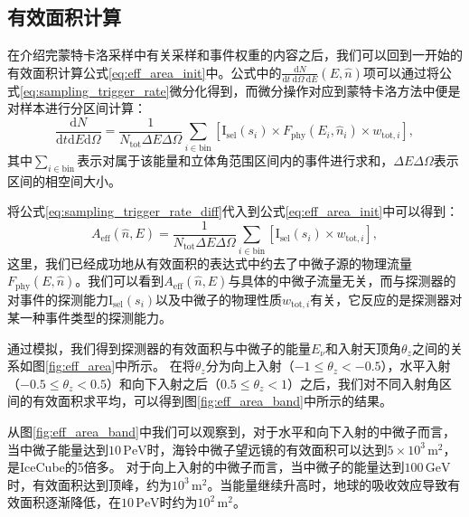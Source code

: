 \subsection{有效面积计算}

在介绍完蒙特卡洛采样中有关采样和事件权重的内容之后，我们可以回到一开始的有效面积计算公式\ref{eq:eff_area_init}中。公式中的$\frac{\mathrm{d}N}{\mathrm{d}t ~\mathrm{d}\Omega ~\mathrm{d}E}(E, \hat{n})$项可以通过将公式\ref{eq:sampling_trigger_rate}微分化得到，而微分操作对应到蒙特卡洛方法中便是对样本进行分区间计算：
\begin{equation}
    \frac{\mathrm{d}N}{\mathrm{d}t \mathrm{d}E \mathrm{d}\Omega} = 
    \frac{1}{N_\mathrm{tot} \Delta E \Delta\Omega} \sum_{i \in \mathrm{bin}} \left[ 
    \mathrm{I}_\mathrm{sel}(s_i) \times 
    F_\mathrm{phy} (E_i, \hat{n}_i) \times
    w_{\mathrm{tot}, i} \right] ,
\label{eq:sampling_trigger_rate_diff}
\end{equation}
其中$\sum_{i \in \mathrm{bin}}$表示对属于该能量和立体角范围区间内的事件进行求和，$\Delta E \Delta\Omega$表示区间的相空间大小。

将公式\ref{eq:sampling_trigger_rate_diff}代入到公式\ref{eq:eff_area_init}中可以得到：
\begin{equation}
    A_\mathrm{eff} (\hat{n}, E) = \frac{1}{N_\mathrm{tot} \Delta E \Delta\Omega} \sum_{i \in \mathrm{bin}} \left[ 
    \mathrm{I}_\mathrm{sel}(s_i) \times 
    w_{\mathrm{tot}, i} \right] ,
    \label{eq:eff_area}
\end{equation}
这里，我们已经成功地从有效面积的表达式中约去了中微子源的物理流量$F_\mathrm{phy} (E, \hat{n})$。我们可以看到$A_\mathrm{eff} (\hat{n}, E)$与具体的中微子流量无关，而与探测器的对事件的探测能力$\mathrm{I}_\mathrm{sel}(s_i)$以及中微子的物理性质$w_{\mathrm{tot}, i}$有关，它反应的是探测器对某一种事件类型的探测能力。

通过模拟，我们得到探测器的有效面积与中微子的能量$E_\nu$和入射天顶角$\theta_z$之间的关系如图\ref{fig:eff_area}中所示。
在将$\theta_z$分为向上入射（$-1 \leq \theta_z < -0.5$），水平入射（$-0.5 \leq \theta_z < 0.5$）和向下入射之后（$0.5 \leq \theta_z < 1$）之后，我们对不同入射角区间的有效面积求平均，可以得到图\ref{fig:eff_area_band}中所示的结果。

从图\ref{fig:eff_area_band}中我们可以观察到，对于水平和向下入射的中微子而言，当中微子能量达到$10\,\mathrm{PeV}$时，海铃中微子望远镜的有效面积可以达到$5 \times 10^3\,\mathrm{m^2}$，是IceCube的5倍多\cite{IceCube_10yr_point_source:2019}。
对于向上入射的中微子而言，当中微子的能量达到$100\,\mathrm{GeV}$时，有效面积达到顶峰，约为$10^3\,\mathrm{m^2}$。当能量继续升高时，地球的吸收效应导致有效面积逐渐降低，在$10\,\mathrm{PeV}$时约为$10^2\,\mathrm{m}^2$。

